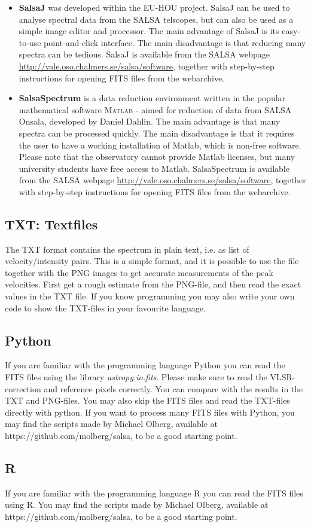 \begin{itemize}
\item \textbf{SalsaJ} was developed within the EU-HOU project.  SalsaJ can be
	used to analyse spectral data from the SALSA telscopes, but can also be
	used as a simple image editor and processor.  The main advantage of SalsaJ
	is its easy-to-use point-and-click interface. The main disadvantage is that
	reducing many spectra can be tedious. SalsaJ is available from the SALSA
	webpage {\url{http://vale.oso.chalmers.se/salsa/software}}, together with
	step-by-step instructions for opening FITS files from the webarchive.
\item \textbf{SalsaSpectrum} is a data reduction environment written
  in the popular mathematical software \textsc{\textsc{Matlab}} -
  aimed for reduction of data from SALSA Onsala, developed by Daniel
  Dahlin. The main advantage is that many spectra can be processed
  quickly. The main disadvantage is that it requires the user to have
  a working installation of Matlab, which is non-free software. Please note 
  that the observatory cannot provide Matlab licenses, but many university
  students have free access to Matlab. SalsaSpectrum is available from 
  the SALSA webpage {\url{http://vale.oso.chalmers.se/salsa/software}}, 
  together with step-by-step instructions for opening FITS files from the webarchive.
\end{itemize}

\subsection{TXT: Textfiles}
The TXT format contains the spectrum in plain text, i.e. as list of
velocity/intensity pairs. This is a simple format, and it is possible to use 
the file together with the PNG images to get accurate measurements of the peak
velocities. First get a rough estimate from the PNG-file, and then read the exact
values in the TXT file. If you know programming you may also write your own code to
show the TXT-files in your favourite language.

\subsection{Python}
If you are familiar with the programming language Python you can read the FITS
files using the library \emph{astropy.io.fits}. Please make sure to read the
VLSR-correction and reference pixels correctly. You can compare with the
results in the TXT and PNG-files. You may also skip the FITS files and read the
TXT-files directly with python. If you want to process many FITS files with Python,
you may find the scripts made by Michael Olberg, available at
https://github.com/molberg/salsa, to be a good starting point. 

\subsection{R}
If you are familiar with the programming language R you can read the FITS files
using R. You may find the scripts made by Michael Olberg, available at
https://github.com/molberg/salsa, to be a good starting point. 
